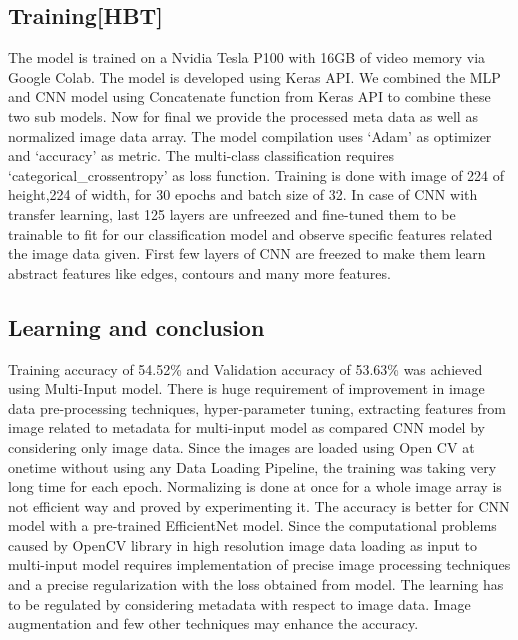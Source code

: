 \subsection{Training[HBT]}
The model is trained on a Nvidia Tesla P100 with 16GB of video memory via Google Colab. The model is developed using Keras API. We combined the MLP and CNN model using Concatenate function from Keras API to combine these two sub models. Now for final we provide the processed meta data as well as normalized image data array. The model compilation uses ‘Adam’ as optimizer and ‘accuracy’ as metric. The multi-class classification requires ‘categorical\_crossentropy’ as loss function. 
Training is done with image of 224 of height,224 of width, for 30 epochs and batch size of 32. In case of CNN with transfer learning, last 125 layers are unfreezed and fine-tuned them to be trainable to fit for our classification model and observe specific features related the image data given. First few layers of CNN are freezed to make them learn abstract features like edges, contours and many more features.

\subsection{Learning and conclusion}

Training accuracy of 54.52\% and Validation accuracy of 53.63\% was achieved using Multi-Input model. There is huge requirement of improvement in image data pre-processing techniques, hyper-parameter tuning, extracting features from image related to metadata for multi-input model as compared CNN model by considering only image data. Since the images are loaded using Open CV at onetime without using any Data Loading Pipeline, the training was taking very long time for each epoch. Normalizing is done at once for a whole image array is not efficient way and proved by experimenting it. 
 The accuracy is better for CNN model with a pre-trained EfficientNet model. Since the computational problems caused by OpenCV library in high resolution image data loading as input to multi-input model requires implementation of precise image processing techniques and a precise regularization with the loss obtained from model. The learning has to be regulated by considering metadata with respect to image data. Image augmentation and few other techniques may enhance the accuracy.  



